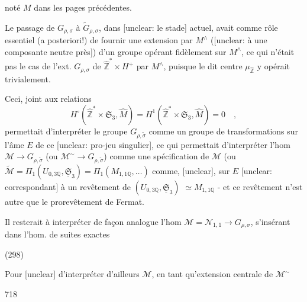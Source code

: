 noté $M$ dans les pages précédentes.

Le passage de $G_{\rho, \sigma}$ à $\tilde{G}_{\rho, \sigma}$, dans [unclear: le stade]
actuel, avait comme rôle
essentiel (a posteriori!) de fournir
une extension par $M^\wedge$ ([unclear: à une composante neutre près]) d'un
groupe opérant fidèlement sur $M^\wedge$, ce
qui n'était pas le cas de l'ext. $G_{\rho, \sigma}$
de $\hat{\mathbb{Z}}^* \times H^+$ par $M^\wedge$, puisque le dit
centre $\mu_{\hat{\mathbb{Z}}}$ y opérait trivialement.

\newpage


Ceci, joint aux relations
$$H^\circ(\hat{\mathbb{Z}}^* \times \mathfrak{S}_3, \hat{M}) = H^1(\hat{\mathbb{Z}}^* \times \mathfrak{S}_3, \hat{M}) = 0 \quad,$$
permettait d'interpréter le groupe
$G_{\rho, \tilde{\sigma}}$ comme un groupe de transformations
sur l'âme $E$ de ce [unclear: pro-jeu singulier],
ce qui permettait d'interpréter
l'hom $\mathcal{M} \to G_{\rho, \tilde{\sigma}}$ (ou $\mathcal{M}^\sim \to G_{\rho, \tilde{\sigma}}$)
comme une spécification de $\mathcal{M}$
(ou $\tilde{\mathcal{M}} = \Pi_1(U_{0,3 \mathbb{Q}}, \underline{\mathfrak{S}}_3) = \Pi_1(M_{1,1 \mathbb{Q}}, \dots)$
comme, [unclear], sur $E$ [unclear: correspondant]
à un revêtement de $(U_{0,3 \mathbb{Q}}, \underline{\mathfrak{S}}_3)$
$\simeq M_{1,1 \mathbb{Q}}$ - et ce revêtement
n'est autre que le prorevêtement
de Fermat.

Il resterait à interpréter de façon
analogue l'hom $\mathcal{M} = \mathcal{N}_{1,1} \to G_{\rho, \sigma}$,
s'insérant dans l'hom. de suites exactes

(298)

Pour [unclear] d'interpréter d'ailleurs
$\mathcal{M}$, en tant qu'extension centrale de $\mathcal{M}^\sim$

\newpage


718

